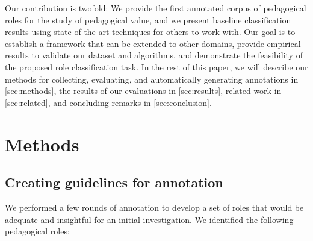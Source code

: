 \documentclass[11pt,a4paper]{article}
\begin{document}
Our contribution is twofold: We provide the first annotated corpus of pedagogical roles for the study of pedagogical value, and we present baseline classification results using state-of-the-art techniques for others to work with. Our goal is to establish a framework that can be extended to other domains, provide empirical results to validate our dataset and algorithms, and demonstrate the feasibility of the proposed role classification task. In the rest of this paper, we will describe our methods for collecting, evaluating, and automatically generating annotations in \autoref{sec:methods}, the results of our evaluations in \autoref{sec:results}, related work in \autoref{sec:related}, and concluding remarks in \autoref{sec:conclusion}.
%
%
%
%
%
%
%


\section{Methods}
\label{sec:methods}

\subsection{Creating guidelines for annotation}
We performed a few rounds of annotation to develop a set of roles that would be adequate and insightful for an initial investigation. We identified the following pedagogical roles:
\end{document}
